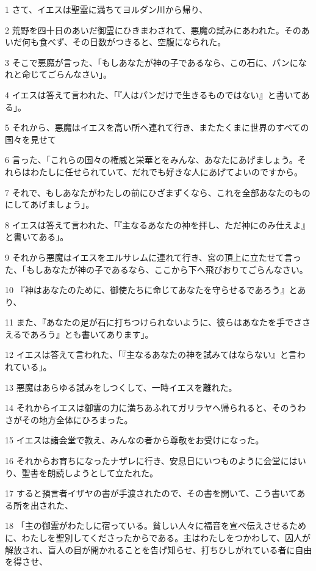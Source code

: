 \par 1 さて、イエスは聖霊に満ちてヨルダン川から帰り、
\par 2 荒野を四十日のあいだ御霊にひきまわされて、悪魔の試みにあわれた。そのあいだ何も食べず、その日数がつきると、空腹になられた。
\par 3 そこで悪魔が言った、「もしあなたが神の子であるなら、この石に、パンになれと命じてごらんなさい」。
\par 4 イエスは答えて言われた、「『人はパンだけで生きるものではない』と書いてある」。
\par 5 それから、悪魔はイエスを高い所へ連れて行き、またたくまに世界のすべての国々を見せて
\par 6 言った、「これらの国々の権威と栄華とをみんな、あなたにあげましょう。それらはわたしに任せられていて、だれでも好きな人にあげてよいのですから。
\par 7 それで、もしあなたがわたしの前にひざまずくなら、これを全部あなたのものにしてあげましょう」。
\par 8 イエスは答えて言われた、「『主なるあなたの神を拝し、ただ神にのみ仕えよ』と書いてある」。
\par 9 それから悪魔はイエスをエルサレムに連れて行き、宮の頂上に立たせて言った、「もしあなたが神の子であるなら、ここから下へ飛びおりてごらんなさい。
\par 10 『神はあなたのために、御使たちに命じてあなたを守らせるであろう』とあり、
\par 11 また、『あなたの足が石に打ちつけられないように、彼らはあなたを手でささえるであろう』とも書いてあります」。
\par 12 イエスは答えて言われた、「『主なるあなたの神を試みてはならない』と言われている」。
\par 13 悪魔はあらゆる試みをしつくして、一時イエスを離れた。
\par 14 それからイエスは御霊の力に満ちあふれてガリラヤへ帰られると、そのうわさがその地方全体にひろまった。
\par 15 イエスは諸会堂で教え、みんなの者から尊敬をお受けになった。
\par 16 それからお育ちになったナザレに行き、安息日にいつものように会堂にはいり、聖書を朗読しようとして立たれた。
\par 17 すると預言者イザヤの書が手渡されたので、その書を開いて、こう書いてある所を出された、
\par 18 「主の御霊がわたしに宿っている。貧しい人々に福音を宣べ伝えさせるために、わたしを聖別してくださったからである。主はわたしをつかわして、囚人が解放され、盲人の目が開かれることを告げ知らせ、打ちひしがれている者に自由を得させ、
